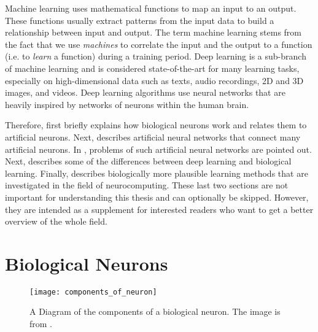 Machine learning uses mathematical functions to map an input to an output.
These functions usually extract patterns from the input data to build a relationship between input and output.
The term machine learning stems from the fact that we use \emph{machines} to correlate the input and the output to a function (i.e. to \emph{learn} a function) during a training period.
Deep learning is a sub-branch of machine learning and is considered state-of-the-art for many learning tasks, especially on high-dimensional data such as texts, audio recordings, 2D and 3D images, and videos.
Deep learning algorithms use neural networks that are heavily inspired by networks of neurons within the human brain.

Therefore,  first briefly explains how biological neurons work and relates them to artificial neurons.
Next,  describes artificial neural networks that connect many artificial neurons.
In , problems of such artificial neural networks are pointed out.
Next,  describes some of the differences between deep learning and biological learning. Finally,  describes biologically more plausible learning methods that are investigated in the field of neurocomputing.
These last two sections are not important for understanding this thesis and can optionally be skipped. However, they are intended as a supplement for interested readers who want to get a better overview of the whole field.

\section{Biological Neurons}
\begin{figure}[h]
    \centering
    \texttt{[image: components\_of\_neuron]}
    \caption[Diagram of the components of a biological neuron]{A Diagram of the components of a biological neuron. The image is from .}
\end{figure}


